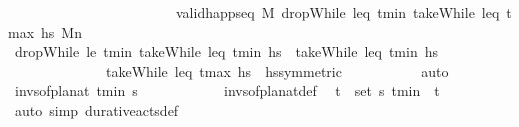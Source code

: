\begin{isabellebody}
\ \ \ \ \ \ \ \ \ \ \ \ \ \ \ \ \ \ \ \ \ \ \ \ {\isachardoublequoteopen}valid{\isacharunderscore}{\kern0pt}happ{\isacharunderscore}{\kern0pt}seq\ M\ {\isacharparenleft}{\kern0pt}dropWhile\ {\isacharparenleft}{\kern0pt}leq\ t\isactrlsub m\isactrlsub i\isactrlsub n{\isacharparenright}{\kern0pt}\ {\isacharparenleft}{\kern0pt}takeWhile\ {\isacharparenleft}{\kern0pt}leq\ t\isactrlsub m\isactrlsub a\isactrlsub x{\isacharparenright}{\kern0pt}\ hs{\isacharparenright}{\kern0pt}{\isacharparenright}{\kern0pt}\ M\isactrlsub n{\isachardoublequoteclose}\isanewline
\ \ \ \ \ \ \ \ \isamarkupfalse%
\ {\isacartoucheopen}dropWhile\ {\isacharparenleft}{\kern0pt}le\ t\isactrlsub m\isactrlsub i\isactrlsub n{\isacharparenright}{\kern0pt}\ {\isacharparenleft}{\kern0pt}takeWhile\ {\isacharparenleft}{\kern0pt}leq\ t\isactrlsub m\isactrlsub i\isactrlsub n{\isacharparenright}{\kern0pt}\ hs{\isacharparenright}{\kern0pt}\ {\isacharequal}{\kern0pt}\ takeWhile\ {\isacharparenleft}{\kern0pt}leq\ t\isactrlsub m\isactrlsub i\isactrlsub n{\isacharparenright}{\kern0pt}\ hs{\isacartoucheclose}\ \isanewline
\ \ \ \ \ \ \ \ \ \ \ \ \ \ {\isacartoucheopen}takeWhile\ {\isacharparenleft}{\kern0pt}leq\ t\isactrlsub m\isactrlsub a\isactrlsub x{\isacharparenright}{\kern0pt}\ hs\ {\isacharequal}{\kern0pt}\ hs{\isacartoucheclose}{\isacharbrackleft}{\kern0pt}symmetric{\isacharbrackright}{\kern0pt}\ \isanewline
\ \ \ \ \ \ \ \ \isamarkupfalse%
\ auto\isanewline
\isanewline
\ \ \ \ \ \ \isamarkupfalse%
\ {\isachardoublequoteopen}invs{\isacharunderscore}{\kern0pt}of{\isacharunderscore}{\kern0pt}plan{\isacharunderscore}{\kern0pt}at\ t\isactrlsub m\isactrlsub i\isactrlsub n\ {\isasympi}s\ {\isacharequal}{\kern0pt}\ {\isacharbraceleft}{\kern0pt}{\isacharbraceright}{\kern0pt}{\isachardoublequoteclose}\isanewline
\ \ \ \ \ \ \ \ \isamarkupfalse%
\ invs{\isacharunderscore}{\kern0pt}of{\isacharunderscore}{\kern0pt}plan{\isacharunderscore}{\kern0pt}at{\isacharunderscore}{\kern0pt}def\ \isamarkupfalse%
\ {\isacartoucheopen}{\isasymforall}{\isacharparenleft}{\kern0pt}t\isactrlsub {\isasympi}{\isacharcomma}{\kern0pt}{\isasympi}{\isacharparenright}{\kern0pt}\ {\isasymin}\ set\ {\isasympi}s{\isachardot}{\kern0pt}\ t\isactrlsub m\isactrlsub i\isactrlsub n\ {\isasymle}\ t\isactrlsub {\isasympi}{\isacartoucheclose}\ \isanewline
\ \ \ \ \ \ \ \ \isamarkupfalse%
\ {\isacharparenleft}{\kern0pt}auto\ simp{\isacharcolon}{\kern0pt}\ durative{\isacharunderscore}{\kern0pt}acts{\isacharunderscore}{\kern0pt}def{\isacharparenright}{\kern0pt}\isanewline

\end{isabellebody}
